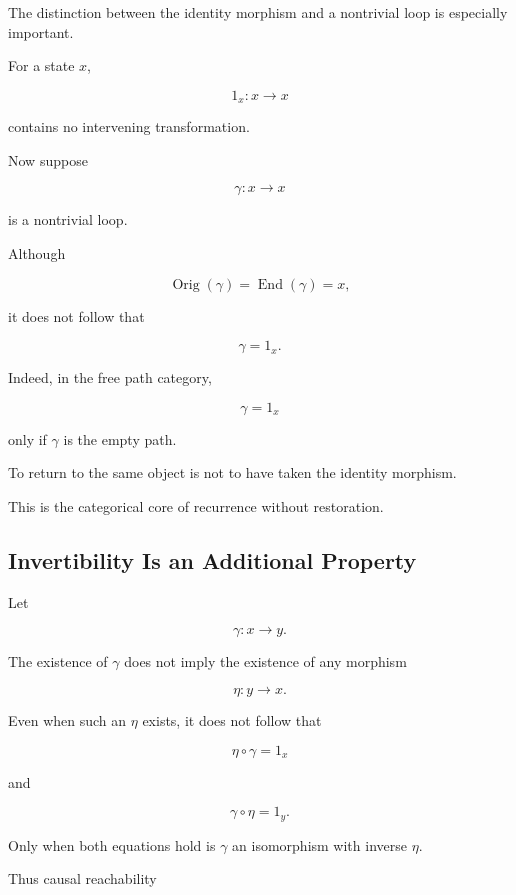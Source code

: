 \documentclass[
  11pt,
  a4paper,
  DIV=12,
  BCOR=0mm,
  parskip=half-
]{scrartcl}
\newcommand{\End}{\operatorname{End}}
\newcommand{\Orig}{\operatorname{Orig}}
\theoremstyle{definition}
\theoremstyle{plain}
\theoremstyle{remark}
\begin{document}
The distinction between the identity morphism and a nontrivial loop is
especially important.

For a state \(x\),

\[
  1_x:x\to x
\]

contains no intervening transformation.

Now suppose

\[
  \gamma:x\to x
\]

is a nontrivial loop.

Although

\[
  \Orig(\gamma)=\End(\gamma)=x,
\]

it does not follow that

\[
  \gamma=1_x.
\]

Indeed, in the free path category,

\[
  \gamma=1_x
\]

only if \(\gamma\) is the empty path.

\begin{held}
\centering
To return to the same object is not to have taken the identity morphism.
\end{held}

This is the categorical core of recurrence without restoration.


\subsection{Invertibility Is an Additional Property}
\label{app:path-invertibility}

Let

\[
  \gamma:x\to y.
\]

The existence of \(\gamma\) does not imply the existence of any morphism

\[
  \eta:y\to x.
\]

Even when such an \(\eta\) exists, it does not follow that

\[
  \eta\circ\gamma=1_x
\]

and

\[
  \gamma\circ\eta=1_y.
\]

Only when both equations hold is \(\gamma\) an isomorphism with inverse
\(\eta\).

Thus causal reachability
\end{document}
